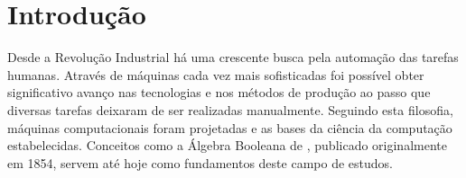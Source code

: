 \documentclass[twoside,english,brazilian]{UNISINOSmonografia}
\begin{document}
%


\tableofcontents


\chapter{Introdução}

{}


	Desde a Revolução Industrial há uma crescente busca pela automação das 
	tarefas humanas. Através de máquinas cada vez mais sofisticadas foi 
	possível obter significativo avanço nas tecnologias e nos métodos de 
	produção ao passo que diversas tarefas deixaram de ser realizadas 
	manualmente.
	Seguindo esta filosofia, máquinas computacionais foram projetadas e as 
	bases da ciência da computação estabelecidas. Conceitos como a 
	Álgebra Booleana de , publicado originalmente em 
	1854, servem até hoje como fundamentos deste campo de estudos.
\end{document}
